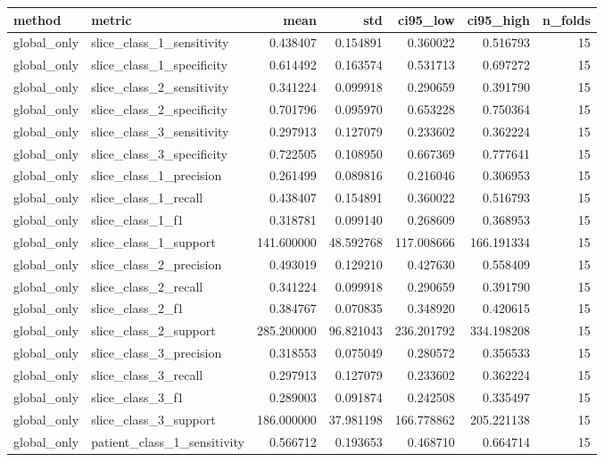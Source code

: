 \begin{tabular}{llrrrrr}
\toprule
method & metric & mean & std & ci95_low & ci95_high & n_folds \\
\midrule
global_only & slice_class_1_sensitivity & 0.438407 & 0.154891 & 0.360022 & 0.516793 & 15 \\
global_only & slice_class_1_specificity & 0.614492 & 0.163574 & 0.531713 & 0.697272 & 15 \\
global_only & slice_class_2_sensitivity & 0.341224 & 0.099918 & 0.290659 & 0.391790 & 15 \\
global_only & slice_class_2_specificity & 0.701796 & 0.095970 & 0.653228 & 0.750364 & 15 \\
global_only & slice_class_3_sensitivity & 0.297913 & 0.127079 & 0.233602 & 0.362224 & 15 \\
global_only & slice_class_3_specificity & 0.722505 & 0.108950 & 0.667369 & 0.777641 & 15 \\
global_only & slice_class_1_precision & 0.261499 & 0.089816 & 0.216046 & 0.306953 & 15 \\
global_only & slice_class_1_recall & 0.438407 & 0.154891 & 0.360022 & 0.516793 & 15 \\
global_only & slice_class_1_f1 & 0.318781 & 0.099140 & 0.268609 & 0.368953 & 15 \\
global_only & slice_class_1_support & 141.600000 & 48.592768 & 117.008666 & 166.191334 & 15 \\
global_only & slice_class_2_precision & 0.493019 & 0.129210 & 0.427630 & 0.558409 & 15 \\
global_only & slice_class_2_recall & 0.341224 & 0.099918 & 0.290659 & 0.391790 & 15 \\
global_only & slice_class_2_f1 & 0.384767 & 0.070835 & 0.348920 & 0.420615 & 15 \\
global_only & slice_class_2_support & 285.200000 & 96.821043 & 236.201792 & 334.198208 & 15 \\
global_only & slice_class_3_precision & 0.318553 & 0.075049 & 0.280572 & 0.356533 & 15 \\
global_only & slice_class_3_recall & 0.297913 & 0.127079 & 0.233602 & 0.362224 & 15 \\
global_only & slice_class_3_f1 & 0.289003 & 0.091874 & 0.242508 & 0.335497 & 15 \\
global_only & slice_class_3_support & 186.000000 & 37.981198 & 166.778862 & 205.221138 & 15 \\
global_only & patient_class_1_sensitivity & 0.566712 & 0.193653 & 0.468710 & 0.664714 & 15 \\

\end{tabular}
